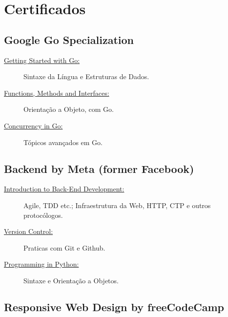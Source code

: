 \documentclass[letterpaper]{../cls/twentysecondcv} %
\begin{document}
    \vspace{0.2cm}



    \newpage %

    \makeprofileNoExtra %

    \section{\LARGE{Certificados}}
    \subsection{\textbf{Google Go Specialization}}
    \begin{description}
      \item[\href{https://buddhilw.github.io/bug-free-fiesta/}{Getting Started with Go:}] Sintaxe da Língua e Estruturas de Dados.
      \item[\href{https://buddhilw.github.io/bug-free-fiesta/}{Functions, Methods and Interfaces:}] Orientação a Objeto, com Go.
      \item[\href{https://buddhilw.github.io/bug-free-fiesta/}{Concurrency in Go:}] Tópicos avançados em Go.
    \end{description}
    \vspace{10mm}
    \subsection{\textbf{Backend by Meta (former Facebook)}}
    \begin{description}
      \item[\href{https://buddhilw.github.io/bug-free-fiesta/}{Introduction to Back-End Development:}] Agile, TDD etc.; Infraestrutura da Web, HTTP, CTP e outros protocólogos.
      \item[\href{https://buddhilw.github.io/bug-free-fiesta/}{Version Control:}] Praticas com Git e Github.
      \item[\href{https://buddhilw.github.io/bug-free-fiesta/}{Programming in Python:}] Sintaxe e Orientação a Objetos.
    \end{description}
    \vspace{10mm}
    \subsection{\textbf{Responsive Web Design by freeCodeCamp}}
\end{document}
